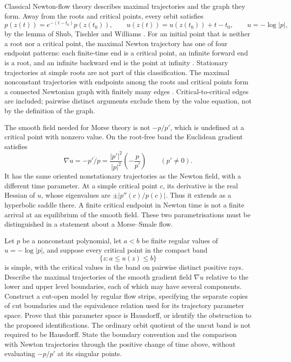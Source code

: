 Classical Newton-flow theory describes maximal trajectories and the graph
they form. Away from the roots and critical points, every orbit satisfies
\[
 p(z(t))=e^{-(t-t_0)}p(z(t_0)),\qquad
 u(z(t))=u(z(t_0))+t-t_0,\qquad u=-\log|p|,
\]
by the lemma of Shub, Tischler and Williams
\cite[Lemma~2.1]{kozen-stefansson1997}. For an initial point that is neither
a root nor a critical point, the maximal Newton trajectory has one of
four endpoint patterns: each finite-time end is a critical point, an
infinite forward end is a root, and an infinite backward end is the
point at infinity \cite[Lemma~2.2]{kozen-stefansson1997}. Stationary
trajectories at simple roots are not part of this classification. The
maximal nonconstant trajectories with endpoints among the roots and critical
points form a connected Newtonian graph with finitely many edges
\cite[Definition~2.1 and \S2]{kozen-stefansson1997}. Critical-to-critical
edges are included; pairwise distinct arguments exclude them by the value
equation, not by the definition of the graph.

The smooth field needed for Morse theory is not $-p/p'$, which is
undefined at a critical point with nonzero value. On the root-free band the
Euclidean gradient satisfies
\[
 \nabla u=-\overline{p'/p}
   =\frac{|p'|^2}{|p|^2}\left(-\frac{p}{p'}\right)
 \qquad(p'\ne0).
\]
It has the same oriented nonstationary trajectories as the Newton
field, with a different time parameter. At a simple critical point
$c$, its derivative is the real Hessian of $u$, whose eigenvalues are
$\pm|p''(c)/p(c)|$. Thus it extends as a hyperbolic saddle there.
A finite critical endpoint in Newton time is not a finite arrival at
an equilibrium of the smooth field. These two parametrisations must be
distinguished in a statement about a Morse--Smale flow.

\begin{problem}\label{prob:globalflow1041}
Let $p$ be a nonconstant polynomial, let $a<b$ be finite regular values
of $u=-\log|p|$, and suppose every critical point in the compact band
\[
 \{z:a\le u(z)\le b\}
\]
is simple, with the critical values in the band on pairwise distinct
positive rays. Describe the maximal trajectories of the smooth gradient
field $\nabla u$ relative to the lower and upper level boundaries,
each of which may have several components. Construct a cut-open model
by regular flow strips, specifying the separate copies of cut boundaries
and the equivalence relation used for its trajectory parameter space.
Prove that this parameter space is Hausdorff, or identify the obstruction
to the proposed identifications. The ordinary orbit quotient of the
uncut band is not required to be Hausdorff. State the boundary convention
and the comparison with Newton trajectories through the positive change
of time above, without evaluating $-p/p'$ at its singular points.
\end{problem}

